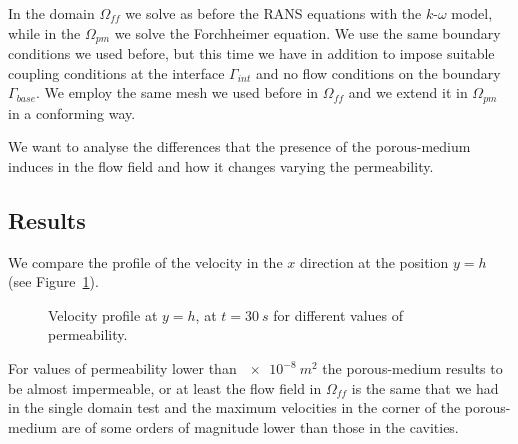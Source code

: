 \documentclass[11pt, a4paper]{article}
\theoremstyle{definition}
\begin{document}
In the domain $\Omega_{ff}$ we solve as before the RANS equations with the 
$k\text{-}\omega$ model, while in the $\Omega_{pm}$ we solve the Forchheimer 
equation. We use the same boundary conditions we used before, but this time we 
have in addition to impose suitable coupling conditions at the interface 
$\Gamma_{int}$ and no flow conditions on the boundary $\Gamma_{base}$.
We employ the same mesh we used before in $\Omega_{ff}$ and we extend it in 
$\Omega_{pm}$ in a conforming way.

We want to analyse the differences that the presence of the porous-medium 
induces in the flow field and how it changes varying the permeability.
\subsection{Results}
We compare the profile of the velocity in the $x$ direction at the position 
$y=h$ (see Figure~\ref{fig:md_wall_velocities}).
\begin{figure}[h]
	\centering
	
	\caption{Velocity profile at $y=h$, at $t=\SI{30}{s}$ for different values 
		of permeability.}
	\label{fig:md_wall_velocities}
\end{figure}

For values of permeability lower than $\SI{e-8}{m^2}$ the porous-medium results 
to be almost impermeable, or at least the flow field in $\Omega_{ff}$ is the 
same that we had in the single domain test and the maximum velocities in the 
corner of the porous-medium are of some orders of magnitude lower than those in 
the cavities.
\end{document}

